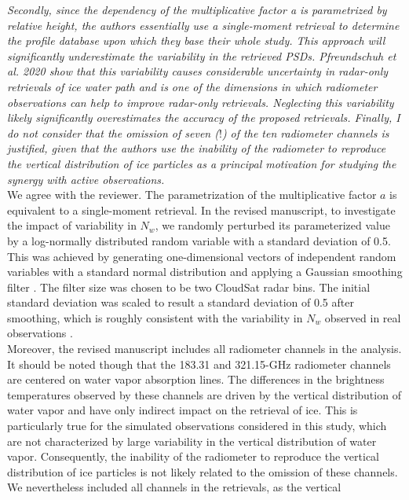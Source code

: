 \documentclass[12pt]{article}
\begin{document}
\noindent \textit{Secondly, since the dependency of the multiplicative factor a is parametrized by relative height,
the authors essentially use a single-moment retrieval to determine the profile database upon
which they base their whole study. This approach will significantly underestimate the variability
in the retrieved PSDs. Pfreundschuh et al. 2020 show that this variability causes considerable
uncertainty in radar-only retrievals of ice water path and is one of the dimensions in which
radiometer observations can help to improve radar-only retrievals. Neglecting this variability
likely significantly overestimates the accuracy of the proposed retrievals.
Finally, I do not consider that the omission of seven ($!$) of the ten radiometer channels is justified,
given that the authors use the inability of the radiometer to reproduce the vertical distribution of
ice particles as a principal motivation for studying the synergy with active observations.}\\
\newline
We agree with the reviewer. The parametrization of the multiplicative factor $a$ is equivalent to a single-moment retrieval. In the revised
manuscript, to investigate the impact of variability in $N_w$, we randomly perturbed its parameterized value by a log-normally distributed
random variable with a standard deviation of 0.5. This was achieved by generating one-dimensional vectors of independent random variables
with a standard normal distribution and applying a Gaussian smoothing filter \cite{nixon2019}.  The filter size was chosen to be two CloudSat radar bins.
The initial standard deviation was scaled to result a standard deviation of 0.5 after smoothing, which is roughly consistent with the variability
in $N_w$ observed in real observations \cite{grecu2018}. \\
\newline 
Moreover, the revised manuscript includes all radiometer channels in the analysis. It should be noted though that the 183.31 and 321.15-GHz radiometer channels
are centered on water vapor absorption lines. The differences in the brightness temperatures observed by these channels are driven by the vertical distribution
of water vapor and have only indirect impact on the retrieval of ice.  This is particularly true for the simulated observations considered in this study, which
are not characterized by large variability in the vertical distribution of water vapor. Consequently, the inability of the radiometer to reproduce the vertical
distribution of ice particles is not likely related to the omission of these channels. We nevertheless included all channels in the retrievals, as the vertical
\end{document}
